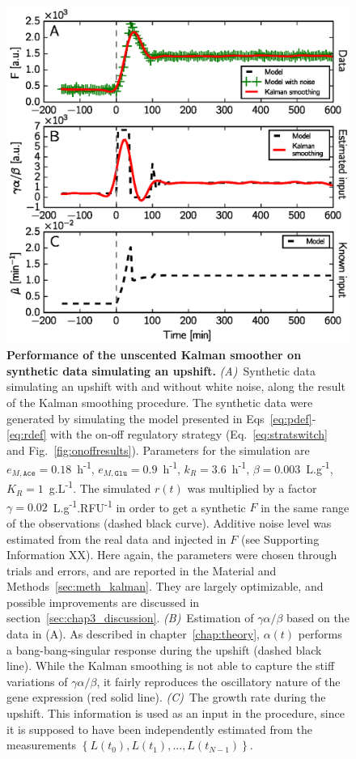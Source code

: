 \begin{figure}[p]
\centering
\includegraphics[scale=0.8]{./Fig/synthetic_upshift}
\caption{
\textbf{Performance of the unscented Kalman smoother on synthetic data simulating an upshift.}
\textit{(A)}~Synthetic data simulating an upshift with and without white noise, along the result of the Kalman smoothing procedure.
The synthetic data were generated by simulating the model presented in Eqs~\ref{eq:pdef}-\ref{eq:rdef} with the on-off regulatory strategy (Eq.~\ref{eq:stratswitch} and Fig.~\ref{fig:onoffresults}).
Parameters for the simulation are $e_{M,\texttt{Ace}} = 0.18$~h\textsuperscript{-1}, $e_{M,\texttt{Glu}} = 0.9$~h\textsuperscript{-1}, $k_R = 3.6$~h\textsuperscript{-1}, $\beta = 0.003$~L.g\textsuperscript{-1}, $K_R = 1$~g.L\textsuperscript{-1}.
The simulated $r(t)$ was multiplied by a factor $\gamma = 0.02$~L.g\textsuperscript{-1}.RFU\textsuperscript{-1} in order to get a synthetic $F$ in the same range of the observations (dashed black curve).
Additive noise level was estimated from the real data and injected in $F$ (see Supporting Information XX).
Here again, the parameters were chosen through trials and errors, and are reported in the Material and Methods~\ref{sec:meth_kalman}.
They are largely optimizable, and possible improvements are discussed in section~\ref{sec:chap3_discussion}.
\textit{(B)}~Estimation of $\gamma \alpha / \beta$ based on the data in (A).
As described in chapter~\ref{chap:theory}, $\alpha (t)$ performs a bang-bang-singular response during the upshift (dashed black line).
While the Kalman smoothing is not able to capture the stiff variations of $\gamma \alpha / \beta$, it fairly reproduces the oscillatory nature of the gene expression (red solid line).
\textit{(C)}~The growth rate during the upshift.
This information is used as an input in the procedure, since it is supposed to have been independently estimated from the measurements $\left\{L(t_0), L(t_1), ..., L(t_{N-1}) \right\}$.
}
\label{fig:synthetic_upshift}
\end{figure}

